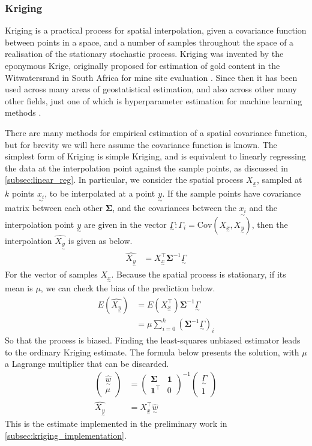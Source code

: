\documentclass[12pt,a4paper]{article} %
\newcommand{\ve}[1]{\underset{\sim}{#1}}
\begin{document}
\subsubsection{Kriging}
\label{subsec:kriging}
Kriging is a practical process for spatial interpolation, given a covariance function between points in a space, and a number of samples throughout the space of a realisation of the stationary stochastic process. Kriging was invented by the eponymous Krige, originally proposed for estimation of gold content in the Witwatersrand in South Africa for mine site evaluation \cite{krige}. Since then it has been used across many areas of geostatistical estimation, and also across other many other fields, just one of which is hyperparameter estimation for machine learning methods \cite{hyperkrige}.

There are many methods for empirical estimation of a spatial covariance function, but for brevity we will here assume the covariance function is known. The simplest form of Kriging is simple Kriging, and is equivalent to linearly regressing the data at the interpolation point against the sample points, as discussed in \ref{subsec:linear_reg}. In particular, we consider the spatial process $X_{\ve{x}}$, sampled at $k$ points $\ve{x_i}$, to be interpolated at a point $\ve{y}$. If the sample points have covariance matrix between each other $\pmb{\Sigma}$, and the covariances between the $\ve{x_i}$ and the interpolation point $\ve{y}$ are given in the vector $\ve{\Gamma}:\Gamma_i=\text{Cov}(X_{\ve{x}},X_{\ve{y}})$, then the interpolation $\hat{X_{\ve{y}}}$ is given as below.
\begin{align*}
    \hat{X_{\ve{y}}}&=X_{\ve{x}}^\top\pmb{\Sigma}^{-1}\ve{\Gamma}
\end{align*}
For the vector of samples $X_{\ve{x}}$.
Because the spatial process is stationary, if its mean is $\mu$, we can check the bias of the prediction below.
\begin{align*}
    E(\hat{X_{\ve{y}}})&=E(X_{\ve{x}}^\top)\pmb{\Sigma}^{-1}\ve{\Gamma}\\
    &=\mu\sum_{i=0}^k(\pmb{\Sigma}^{-1}\ve{\Gamma})_i
\end{align*}
So that the process is biased. Finding the least-squares unbiased estimator leads to the ordinary Kriging estimate. The formula below presents the solution, with $\mu$ a Lagrange multiplier that can be discarded.
\begin{align*}
    \begin{pmatrix}
        \hat{\ve{w}}\\
        \mu
    \end{pmatrix}&=\begin{pmatrix}
        \pmb{\Sigma} & \mathbf{1}\\
        \mathbf{1}^\top & 0
    \end{pmatrix}^{-1}\begin{pmatrix}
        \ve{\Gamma}\\
        1
    \end{pmatrix}\\
    \hat{X_{\ve{y}}}&=X_{\ve{x}}^\top \hat{\ve{w}}
\end{align*}
This is the estimate implemented in the preliminary work in \ref{subsec:kriging_implementation}.
\end{document}
